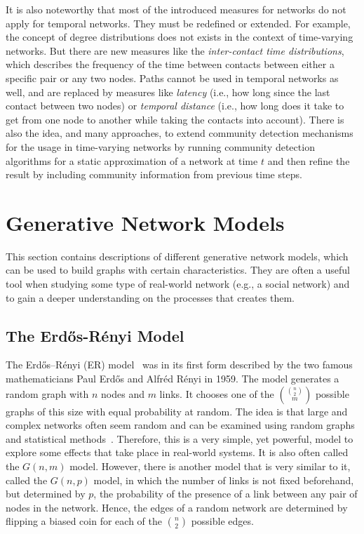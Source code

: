 It is also noteworthy that most of the introduced measures for networks do not apply for temporal networks.
They must be redefined or extended.
For example, the concept of degree distributions does not exists in the context of time-varying networks.
But there are new measures like the \emph{inter-contact time distributions}, which describes the frequency of the time between contacts between either a specific pair or any two nodes.
Paths cannot be used in temporal networks as well, and are replaced by measures like \emph{latency} (i.e., how long since the last contact between two nodes) or \emph{temporal distance} (i.e., how long does it take to get from one node to another while taking the contacts into account).
There is also the idea, and many approaches, to extend community detection mechanisms for the usage in time-varying networks by running community detection algorithms for a static approximation of a network at time \( t \) and then refine the result by including community information from previous time steps.




\section{Generative Network Models}
\label{sec:network-models}

This section contains descriptions of different generative network models, which can be used to build graphs with certain characteristics.
They are often a useful tool when studying some type of real-world network (e.g., a social network) and to gain a deeper understanding on the processes that creates them.


\subsection{The Erdős-Rényi Model}
\label{subsec:erdos-reni-model}

The Erdős–Rényi (ER) model~\cite{Erdos1959, Newman2010} was in its first form described by the two famous mathematicians Paul Erdős and Alfréd Rényi in 1959.
The model generates a random graph with \(n\) nodes and \(m\) links.
It chooses one of the \(\binom{\binom{n}{2}}{m}\) possible graphs of this size with equal probability at random.
The idea is that large and complex networks often seem random and can be examined using random graphs and statistical methods~\cite{Barabasi2002}.
Therefore, this is a very simple, yet powerful, model to explore some effects that take place in real-world systems.
It is also often called the \( G(n, m) \) model.
However, there is another model that is very similar to it, called the \(G(n, p)\) model, in which the number of links is not fixed beforehand, but determined by \(p\), the probability of the presence of a link between any pair of nodes in the network.
Hence, the edges of a random network are determined by flipping a biased coin for each of the \(\binom{n}{2}\) possible edges.

